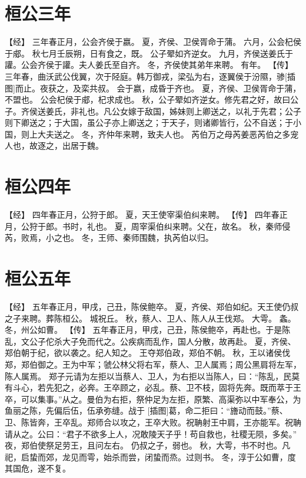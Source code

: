 \documentclass[a4paper,12pt,UTF8,twoside]{ctexbook}
\begin{document}
\chapter{桓公三年}

【经】
三年春正月，公会齐侯于嬴。
夏，齐侯、卫侯胥命于蒲。
六月，公会杞侯于郕。
秋七月壬辰朔，日有食之，既。
公子翚如齐逆女。
九月，齐侯送姜氏于讙。公会齐侯于讙。夫人姜氏至自齐。
冬，齐侯使其弟年来聘。
有年。
【传】
三年春，曲沃武公伐翼，次于陉庭。韩万御戎，梁弘为右，逐翼侯于汾隰，骖[插图]而止。夜获之，及栾共叔。
会于嬴，成昏于齐也。
夏，齐侯、卫侯胥命于蒲，不盟也。
公会杞侯于郕，杞求成也。
秋，公子翚如齐逆女。修先君之好，故曰公子。齐侯送姜氏，非礼也。凡公女嫁于敌国，姊妹则上卿送之，以礼于先君；公子则下卿送之；于大国，虽公子亦上卿送之；于天子，则诸卿皆行，公不自送；于小国，则上大夫送之。
冬，齐仲年来聘，致夫人也。
芮伯万之母芮姜恶芮伯之多宠人也，故逐之，出居于魏。

\chapter{桓公四年}

【经】
四年春正月，公狩于郎。
夏，天王使宰渠伯纠来聘。
【传】
四年春正月，公狩于郎。书时，礼也。
夏，周宰渠伯纠来聘。父在，故名。
秋，秦师侵芮，败焉，小之也。
冬，王师、秦师围魏，执芮伯以归。

\chapter{桓公五年}

【经】
五年春正月，甲戌，己丑，陈侯鲍卒。
夏，齐侯、郑伯如纪。天王使仍叔之子来聘。葬陈桓公。
城祝丘。
秋，蔡人、卫人、陈人从王伐郑。
大雩。
螽。
冬，州公如曹。
【传】
五年春正月，甲戌，己丑，陈侯鲍卒，再赴也。于是陈乱，文公子佗杀大子免而代之。公疾病而乱作，国人分散，故再赴。
夏，齐侯、郑伯朝于纪，欲以袭之。纪人知之。
王夺郑伯政，郑伯不朝。
秋，王以诸侯伐郑，郑伯御之。王为中军；虢公林父将右军，蔡人、卫人属焉；周公黑肩将左军，陈人属焉。
郑子元请为左拒以当蔡人、卫人，为右拒以当陈人，曰：“陈乱，民莫有斗心，若先犯之，必奔。王卒顾之，必乱。蔡、卫不枝，固将先奔。既而萃于王卒，可以集事。”从之。曼伯为右拒，祭仲足为左拒，原繁、高渠弥以中军奉公，为鱼丽之陈，先偏后伍，伍承弥缝。战于 [插图]葛，命二拒曰：“旝动而鼓。”蔡、卫、陈皆奔，王卒乱。郑师合以攻之，王卒大败。祝聃射王中肩，王亦能军。祝聃请从之。公曰：“君子不欲多上人，况敢陵天子乎！苟自救也，社稷无陨，多矣。”
夜，郑伯使祭足劳王，且问左右。
仍叔之子，弱也。
秋，大雩，书不时也。凡祀，启蛰而郊，龙见而雩，始杀而尝，闭蛰而烝。过则书。
冬，淳于公如曹，度其国危，遂不复。
\end{document}
